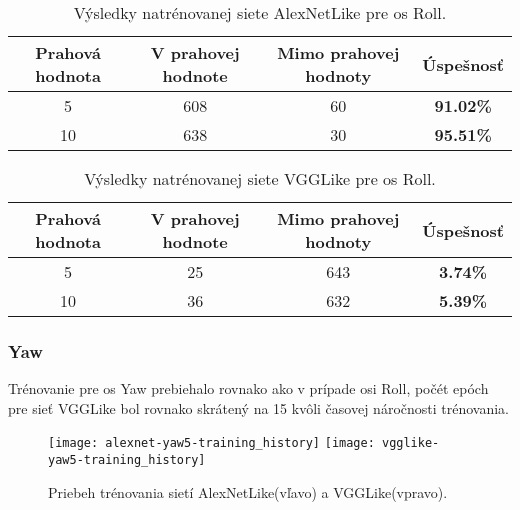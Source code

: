 \begin{table}[H]
    \centering
    \begin{tabular}{|c|c|c|c|}
        \hline
        Prahová hodnota & V prahovej hodnote       & Mimo prahovej hodnoty    & Úspešnosť    \\ \hline
        5               & {\color[HTML]{009901} 608} & {\color[HTML]{9A0000} 60} & \textbf{91.02\%} \\ \hline
        10              & {\color[HTML]{009901} 638} & {\color[HTML]{9A0000} 30} & \textbf{95.51\%} \\ \hline
    \end{tabular}
    \caption{Výsledky natrénovanej siete AlexNetLike pre os Roll.}
    \label{tab:alexnetrollresults}
\end{table}
\begin{table}[H]
    \centering
    \begin{tabular}{|c|c|c|c|}
        \hline
        Prahová hodnota & V prahovej hodnote       & Mimo prahovej hodnoty    & Úspešnosť    \\ \hline
        5               & {\color[HTML]{009901} 25} & {\color[HTML]{9A0000} 643} & \textbf{3.74\%} \\ \hline
        10              & {\color[HTML]{009901} 36} & {\color[HTML]{9A0000} 632} & \textbf{5.39\%} \\ \hline
    \end{tabular}
    \caption{Výsledky natrénovanej siete VGGLike pre os Roll.}
    \label{tab:vgglikerollresults}
\end{table}


\subsubsection{Yaw}
Trénovanie pre os Yaw prebiehalo rovnako ako v prípade osi Roll, počét epóch pre sieť VGGLike
    bol rovnako skrátený na 15 kvôli časovej náročnosti trénovania.

\begin{figure}[H]
    \centering
    \texttt{[image: alexnet-yaw5-training\_history]}
	\texttt{[image: vgglike-yaw5-training\_history]}
	\caption{Priebeh trénovania sietí AlexNetLike(vľavo) a VGGLike(vpravo).}
	\label{pic:yawaxis}
\end{figure}

